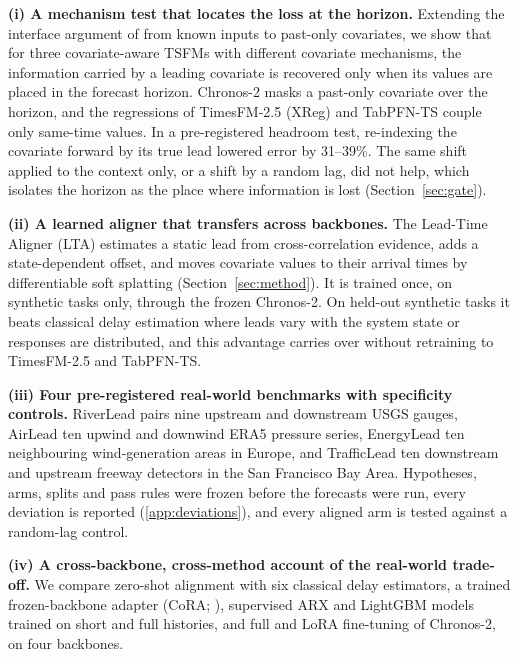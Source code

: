 \documentclass[preprint,11pt,authoryear]{elsarticle}
\newcommand{\lta}{\textsc{LTA}}
\begin{document}
\textbf{(i) A mechanism test that locates the loss at the horizon.} Extending the interface argument of \citet{won2026attenuated} from known inputs to past-only covariates, we show that for three covariate-aware TSFMs with different covariate mechanisms, the information carried by a leading covariate is recovered only when its values are placed in the forecast horizon. Chronos-2 masks a past-only covariate over the horizon, and the regressions of TimesFM-2.5 (XReg) and TabPFN-TS couple only same-time values. In a pre-registered headroom test, re-indexing the covariate forward by its true lead lowered error by 31--39\%. The same shift applied to the context only, or a shift by a random lag, did not help, which isolates the horizon as the place where information is lost (Section~\ref{sec:gate}).

\textbf{(ii) A learned aligner that transfers across backbones.} The Lead-Time Aligner (\lta{}) estimates a static lead from cross-correlation evidence, adds a state-dependent offset, and moves covariate values to their arrival times by differentiable soft splatting (Section~\ref{sec:method}). It is trained once, on synthetic tasks only, through the frozen Chronos-2. On held-out synthetic tasks it beats classical delay estimation where leads vary with the system state or responses are distributed, and this advantage carries over without retraining to TimesFM-2.5 and TabPFN-TS.

\textbf{(iii) Four pre-registered real-world benchmarks with specificity controls.} RiverLead pairs nine upstream and downstream USGS gauges, AirLead ten upwind and downwind ERA5 pressure series, EnergyLead ten neighbouring wind-generation areas in Europe, and TrafficLead ten downstream and upstream freeway detectors in the San Francisco Bay Area. Hypotheses, arms, splits and pass rules were frozen before the forecasts were run, every deviation is reported (\ref{app:deviations}), and every aligned arm is tested against a random-lag control.

\textbf{(iv) A cross-backbone, cross-method account of the real-world trade-off.} We compare zero-shot alignment with six classical delay estimators, a trained frozen-backbone adapter (CoRA; \citealp{qin2025cora}), supervised ARX and LightGBM models trained on short and full histories, and full and LoRA fine-tuning of Chronos-2, on four backbones.
\end{document}

